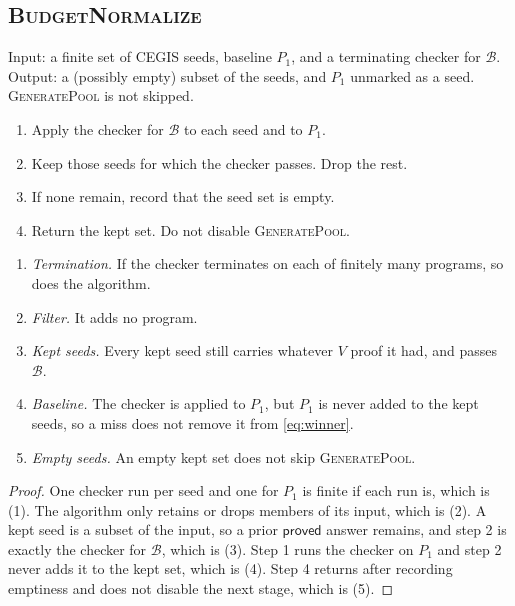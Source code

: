 \subsection{\textsc{BudgetNormalize}}

\begin{algo}
\label{alg:budgetnormalize}
Input: a finite set of CEGIS seeds, baseline \(P_1\), and a terminating
checker for \(\mathcal{B}\).
Output: a (possibly empty) subset of the seeds, and \(P_1\) unmarked as a
seed. \textsc{GeneratePool} is not skipped.
\begin{enumerate}
  \item Apply the checker for \(\mathcal{B}\) to each seed and to
  \(P_1\).
  \item Keep those seeds for which the checker passes. Drop the rest.
  \item If none remain, record that the seed set is empty.
  \item Return the kept set. Do not disable \textsc{GeneratePool}.
\end{enumerate}
\end{algo}

\begin{lemma}
\label{lem:budgetnormalize}
\begin{enumerate}
  \item \emph{Termination.} If the checker terminates on each of finitely
  many programs, so does the algorithm.
  \item \emph{Filter.} It adds no program.
  \item \emph{Kept seeds.} Every kept seed still carries whatever \(V\)
  proof it had, and passes \(\mathcal{B}\).
  \item \emph{Baseline.} The checker is applied to \(P_1\), but \(P_1\) is
  never added to the kept seeds, so a miss does not remove it from
  \eqref{eq:winner}.
  \item \emph{Empty seeds.} An empty kept set does not skip
  \textsc{GeneratePool}.
\end{enumerate}
\end{lemma}
\begin{proof}
One checker run per seed and one for \(P_1\) is finite if each run is,
which is (1). The algorithm only retains or drops members of its input,
which is (2). A kept seed is a subset of the input, so a prior
\(\mathsf{proved}\) answer remains, and step 2 is exactly the checker for
\(\mathcal{B}\), which is (3). Step 1 runs the checker on \(P_1\) and
step 2 never adds it to the kept set, which is (4). Step 4 returns after recording
emptiness and does not disable the next stage, which is (5).
\end{proof}

